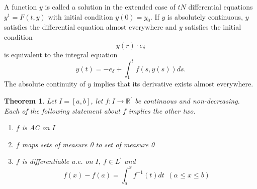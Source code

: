 \documentclass[a4 paper, 12pt]{report}
\theoremstyle{plain}
\newtheorem{theorem}{\textbf{Theorem}}[section]
\begin{document}
\noindent
\par A function $y$ is called a solution in the extended case of $t N$ differential equations $y^1 = F(t,y)$ with initial condition $y(0) = y_0$. If $y$ is absolutely continuous, $y$ satisfies the differential equation almost everywhere and $y$ satisfies the initial condition
$$
y(r)\cdot e_\delta
$$
is equivalent to the integral equation
$$
y(t) = -e_\delta+\int_1^tf(s,y(s))ds.
$$
The absolute continuity of $y$ implies that its derivative exists almost everywhere.
\begin{theorem}\label{T1}
Let $I = [a,b]$, let $f:I\rightarrow\mathbb{R}^\prime$ be continuous and non-decreasing. Each of the following statement about $f$ implies the other two.
\begin{enumerate}
\item[(a)] $f$ is AC on $I$
\item[(b)] $f$ maps sets of measure 0 to set of measure 0
\item[(c)] $f$ is differentiable a.e. on $I,~f\in L^\prime$ and 
\begin{equation}\label{2.1.29}
f(x) - f(a) = \int_a^xf^{-1}(t)dt~~(\alpha\leq x\leq b)
\end{equation}
\end{enumerate}
\end{theorem}
\end{document}
